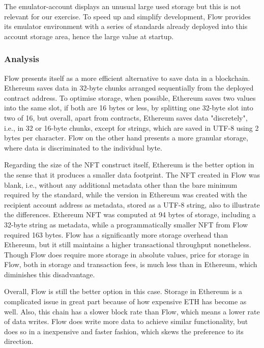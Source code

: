 \documentclass[../NFTComp_IEEE.tex]{subfiles}
\begin{document}
The emulator-account displays an unusual large used storage but this is not relevant for our exercise. To speed up and simplify development, Flow provides its emulator environment with a series of standards already deployed into this account storage area, hence the large value at startup.

\subsubsection{Analysis}
Flow presents itself as a more efficient alternative to save data in a blockchain. Ethereum saves data in 32-byte chunks arranged sequentially from the deployed contract address. To optimise storage, when possible, Ethereum saves two values into the same slot, if both are 16 bytes or less, by splitting one 32-byte slot into two of 16, but overall, apart from contracts, Ethereum saves data "discretely", i.e., in 32 or 16-byte chunks, except for strings, which are saved in UTF-8 using 2 bytes per character. Flow on the other hand presents a more granular storage, where data is discriminated to the individual byte.
\par
Regarding the size of the NFT construct itself, Ethereum is the better option in the sense that it produces a smaller data footprint. The NFT created in Flow was blank, i.e., without any additional metadata other than the bare minimum required by the standard, while the version in Ethereum was created with the recipient account address as metadata, stored as a UTF-8 string, also to illustrate the differences. Ethereum NFT was computed at 94 bytes of storage, including a 32-byte string as metadata, while a programmatically smaller NFT from Flow required 163 bytes. Flow has a significantly more storage overhead than Ethereum, but it still maintains a higher transactional throughput nonetheless. Though Flow does require more storage in absolute values, price for storage in Flow, both in storage and transaction fees, is much less than in Ethereum, which diminishes this disadvantage.
\par
Overall, Flow is still the better option in this case. Storage in Ethereum is a complicated issue in great part because of how expensive ETH has become as well. Also, this chain has a slower block rate than Flow, which means a lower rate of data writes. Flow does write more data to achieve similar functionality, but does so in a inexpensive and faster fashion, which skews the preference to its direction.
\end{document}
